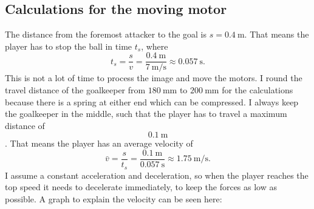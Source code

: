 \subsection{Calculations for the moving motor}\label{subsec:moving_motor}
The distance from the foremost attacker to the goal is $s=\qty[per-mode=symbol]{0.4}{\m}$.
That means the player has to stop the ball in time $t_s$, where
\begin{equation}
    \label{eq:stopping_time}
    t_s = \frac{s}{v} = \frac{\qty[per-mode=symbol]{0.4}{\m}}{\qty[per-mode=symbol]{7}{\m\per\s}} \approx \qty[per-mode=symbol]{0.057}{\s}.
\end{equation}
This is not a lot of time to process the image and move the motors.
I round the travel distance of the goalkeeper from $\qty[per-mode=symbol]{180}{\mm}$ to $\qty[per-mode=symbol]{200}{\mm}$ for the calculations because there is a spring at either end which can be compressed.
I always keep the goalkeeper in the middle, such that the player has to travel a maximum distance of $$\qty[per-mode=symbol]{0.1}{\m}$$.
That means the player has an average velocity of
\begin{equation}
    \label{eq:average_velocity}
    \bar{v} = \frac{s}{t_s} = \frac{\qty[per-mode=symbol]{0.1}{\m}}{\qty[per-mode=symbol]{0.057}{\s}} \approx \qty[per-mode=symbol]{1.75}{\m\per\s}.
\end{equation}
I assume a constant acceleration and deceleration, so when the player reaches the top speed it needs to decelerate immediately, to keep the forces as low as possible.
A graph to explain the velocity can be seen here:

\begin{center}
\end{center}

